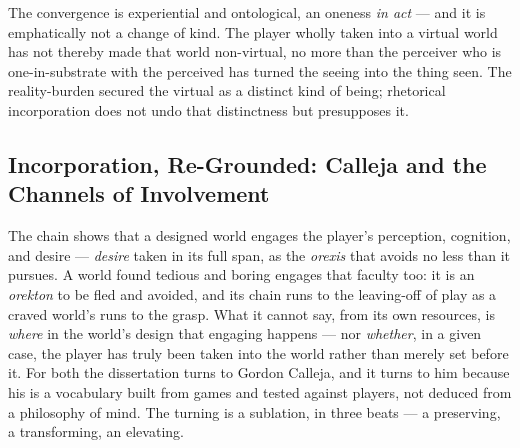 \documentclass{article}
\begin{document}
The convergence is experiential and ontological, an oneness \textit{in act} — and it is emphatically not a change of kind. The player wholly taken into a virtual world has not thereby made that world non-virtual, no more than the perceiver who is one-in-substrate with the perceived has turned the seeing into the thing seen. The reality-burden secured the virtual as a distinct kind of being; rhetorical incorporation does not undo that distinctness but presupposes it.

\subsection*{Incorporation, Re-Grounded: Calleja and the Channels of Involvement}

The chain shows that a designed world engages the player's perception, cognition, and desire — \textit{desire} taken in its full span, as the \textit{orexis} that avoids no less than it pursues. A world found tedious and boring engages that faculty too: it is an \textit{orekton} to be fled and avoided, and its chain runs to the leaving-off of play as a craved world's runs to the grasp. What it cannot say, from its own resources, is \textit{where} in the world's design that engaging happens — nor \textit{whether}, in a given case, the player has truly been taken into the world rather than merely set before it. For both the dissertation turns to Gordon Calleja, and it turns to him because his is a vocabulary built from games and tested against players, not deduced from a philosophy of mind. The turning is a sublation, in three beats — a preserving, a transforming, an elevating.
\end{document}

